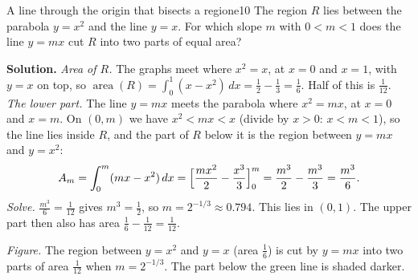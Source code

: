 \documentclass[11pt]{article}
\begin{document}
\begin{exmp}{A line through the origin that bisects a region}{e10}
The region $R$ lies between the parabola $y=x^2$ and the line $y=x$. For which slope $m$ with $0<m<1$ does the line $y=mx$ cut $R$ into two parts of equal area?

\textbf{Solution.} \emph{Area of $R$.} The graphs meet where $x^2=x$, at $x=0$ and $x=1$, with $y=x$ on top, so $\operatorname{area}(R)=\int_0^1(x-x^2)\,dx=\frac12-\frac13=\frac16$. Half of this is $\frac1{12}$.
\emph{The lower part.} The line $y=mx$ meets the parabola where $x^2=mx$, at $x=0$ and $x=m$. On $(0,m)$ we have $x^2<mx<x$ (divide by $x>0$: $x<m<1$), so the line lies inside $R$, and the part of $R$ below it is the region between $y=mx$ and $y=x^2$:
\[
A_m=\int_0^m(mx-x^2)\,dx=\Bigl[\frac{mx^2}2-\frac{x^3}3\Bigr]_0^m=\frac{m^3}2-\frac{m^3}3=\frac{m^3}6 .
\]
\emph{Solve.} $\frac{m^3}6=\frac1{12}$ gives $m^3=\frac12$, so $m=2^{-1/3}\approx0.794$. This lies in $(0,1)$. The upper part then also has area $\frac16-\frac1{12}=\frac1{12}$.

\begin{center}
\par\small\emph{Figure.} The region between $y=x^2$ and $y=x$ (area $\frac16$) is cut by $y=mx$ into two parts of area $\frac1{12}$ when $m=2^{-1/3}$. The part below the green line is shaded darker.
\end{center}
\end{exmp}
\end{document}
